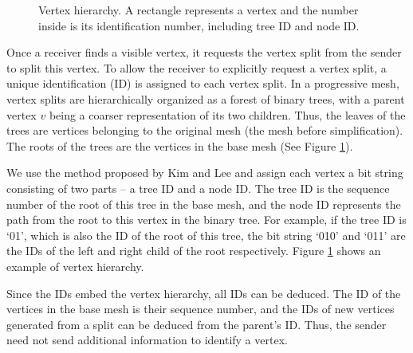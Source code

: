 

    \begin{figure}
    \centering
    \caption{Vertex hierarchy. A rectangle represents a vertex and the number inside
    is its identification number, including tree ID and node ID.\label{hierarchy}}
    \end{figure}
    Once a receiver finds a visible vertex, it
    requests the vertex split from the sender to split this vertex.
    To allow the receiver to explicitly request a vertex split, a
    unique identification (ID) is assigned to each vertex split.  In a
    progressive mesh, vertex splits are hierarchically organized as a forest of
    binary trees, 
    with a parent vertex $v$ being a coarser representation of its
    two children.  Thus, the leaves of the trees are vertices
    belonging to the original mesh (the mesh before simplification).  
    The roots of the trees are the 
    vertices in the base mesh (See Figure \ref{hierarchy}).
    
    We use the method proposed by Kim and Lee
    \cite{kim01truly} and assign each vertex a bit string
    consisting of two parts -- a tree ID and a node ID.  The
    tree ID is the sequence number of the root of this tree
    in the base mesh, and the node ID represents the path
    from the root to this vertex in the binary tree.  For
    example, if the tree ID is `01', which is also the ID of
    the root of this tree, the bit string `010' and
    `011' are the IDs of the left and right child of
    the root respectively.  Figure \ref{hierarchy} shows
    an example of vertex hierarchy.

    Since the IDs embed
    the vertex hierarchy, all IDs can be deduced.  The ID of the vertices in the base mesh
    is their sequence number, and the IDs of new
    vertices generated from a split can be deduced from the
    parent's ID.  Thus, the sender need not send additional information
    to identify a vertex.

